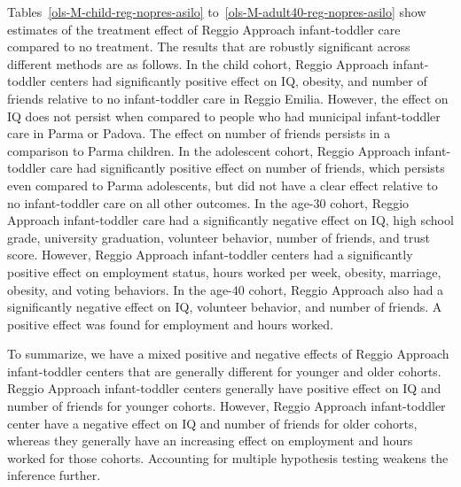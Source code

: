 Tables~\ref{ols-M-child-reg-nopres-asilo} to~\ref{ols-M-adult40-reg-nopres-asilo} show estimates of the treatment effect of Reggio Approach infant-toddler care compared to no treatment. The results that are robustly significant across different methods are as follows. In the child cohort, Reggio Approach infant-toddler centers had significantly positive effect on IQ, obesity, and number of friends relative to no infant-toddler care in Reggio Emilia. However, the effect on IQ does not persist when compared to people who had municipal infant-toddler care in Parma or Padova. The effect on number of friends persists in a comparison to Parma children. In the adolescent cohort, Reggio Approach infant-toddler care had significantly positive effect on number of friends, which persists even compared to Parma adolescents, but did not have a clear effect relative to no infant-toddler care on all other outcomes. In the age-30 cohort, Reggio Approach infant-toddler care had a significantly negative effect on IQ, high school grade, university graduation, volunteer behavior, number of friends, and trust score. However, Reggio Approach infant-toddler centers had a significantly positive effect on employment status, hours worked per week, obesity,  marriage, obesity, and voting behaviors. In the age-40 cohort, Reggio Approach also had a significantly negative effect on IQ, volunteer behavior, and number of friends. A positive effect was found for employment and hours worked.

To summarize, we have a mixed positive and negative effects of Reggio Approach infant-toddler centers that are generally different for younger and older cohorts. Reggio Approach infant-toddler centers generally have positive effect on IQ and number of friends for younger cohorts. However, Reggio Approach infant-toddler center have a negative effect on IQ and number of friends for older cohorts, whereas they generally have an increasing effect on employment and hours worked for those cohorts. Accounting for multiple hypothesis testing weakens the inference further.

